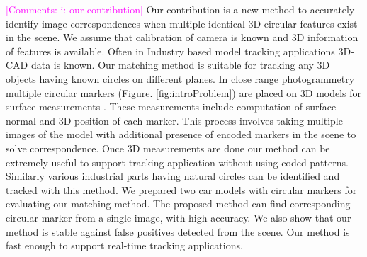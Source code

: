 \documentclass{bmvc2k}
\newcommand{\parmessage}[1]{\textcolor{cyan}{[Paragraph: #1]}}
\newcommand{\comments}[1]{\textcolor{magenta}{[Comments: #1]}}
\newcommand{\yuji}[1]{\textcolor{magenta}{[Yuji: #1]}}
\def\etal{\emph{et al}\bmvaOneDot}
\begin{document}
\comments{i: our contribution}
Our contribution is a new method to accurately identify image correspondences when multiple identical 3D circular features exist in the scene. We assume that calibration of camera is known and 3D information of features is available. 
Often in Industry based model tracking applications 3D-CAD data is known. Our matching method is suitable for tracking any 3D objects having known circles on different planes. In close range photogrammetry multiple circular markers (Figure. \ref{fig:introProblem}) are placed on 3D models for surface measurements \cite{luhmann_close_2006}. 
These measurements include computation of surface normal and 3D position of each marker. 
This process involves taking multiple images of the model with additional presence of encoded markers in the scene to solve correspondence. 
Once 3D measurements are done our method can be extremely useful to support tracking application without using coded patterns. Similarly various industrial parts having natural circles can be identified and tracked with this method. 
We prepared two car models with circular markers for evaluating our matching method. The proposed method can find corresponding circular marker from a single image, with high accuracy. We also show that our method is stable against false positives detected from the scene. Our method is fast enough to support real-time tracking applications. 

\end{document}
